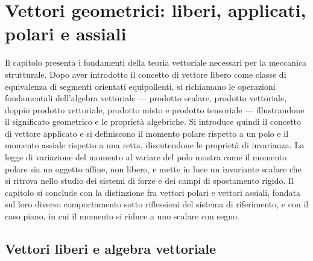 \graphicspath{{Parti/P01-Preliminari/A04-Vettori_Polari_Assiali_Liberi_Applicati/Figure/}}
%	
\chapter{Vettori geometrici: liberi, applicati, polari e assiali}\label{app:vettori_geometrici}




\begin{sommario}
	Il capitolo presenta i fondamenti della teoria vettoriale necessari per	la meccanica strutturale. Dopo aver introdotto il concetto di vettore	libero come classe di equivalenza di segmenti orientati equipollenti,	si richiamano le operazioni fondamentali dell'algebra vettoriale ---	prodotto scalare, prodotto vettoriale, doppio prodotto vettoriale,	prodotto misto e prodotto tensoriale --- illustrandone il significato	geometrico e le proprietà algebriche. Si introduce quindi il concetto
	di vettore applicato e si definiscono il momento polare rispetto a un	polo e il momento assiale rispetto a una retta, discutendone le	proprietà di invarianza. La legge di variazione del momento al variare	del polo mostra come il momento polare sia un oggetto affine, non	libero, e mette in luce un invariante scalare che si ritrova nello studio dei sistemi di forze e dei campi di spostamento rigido.	Il capitolo si conclude con la distinzione fra vettori polari e vettori	assiali, fondata sul loro diverso comportamento sotto riflessioni del	sistema di riferimento, e con il caso piano, in cui il momento si	riduce a uno scalare con segno.
\end{sommario}

\section{Vettori liberi e algebra vettoriale}

